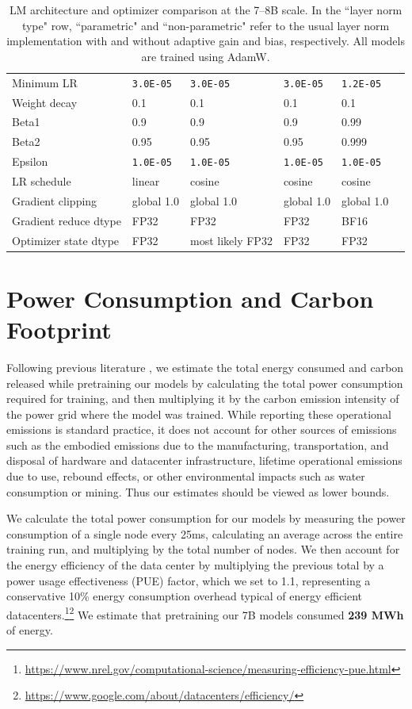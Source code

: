 \documentclass[11pt]{article}
\begin{document}
\begin{table}[t]
\begin{tabular}{l|lllll}
        Minimum LR & \texttt{3.0E-05} & \texttt{3.0E-05} & \texttt{3.0E-05} & \texttt{1.2E-05} \\
        Weight decay & 0.1 & 0.1 & 0.1 & 0.1 \\
        Beta1 & 0.9 & 0.9 & 0.9 & 0.99 \\
        Beta2 & 0.95 & 0.95 & 0.95 & 0.999 \\
        Epsilon & \texttt{1.0E-05} & \texttt{1.0E-05} & \texttt{1.0E-05} & \texttt{1.0E-05} \\
        LR schedule & linear & cosine & cosine & cosine \\
        Gradient clipping & global 1.0 & global 1.0 & global 1.0 & global 1.0 \\
        Gradient reduce dtype & FP32 & FP32 & FP32 & BF16 \\
        Optimizer state dtype & FP32 & most likely FP32 & FP32 & FP32 \\
        \bottomrule
    \end{tabular}
    \caption{LM architecture and optimizer comparison at the 7--8B scale. In the ``layer norm type" row, ``parametric" and ``non-parametric" refer to the usual layer norm implementation with and without adaptive gain and bias, respectively. All models are trained using AdamW.}
    \label{tab:llm_arch_adamw}
\end{table}

\section{Power Consumption and Carbon Footprint}
\label{sec:carbon}

Following previous literature \citep{strubell-etal-2019-energy, patterson2021carbon, wu2022sustainable, dodge2022measuring}, we estimate the total energy consumed and carbon released while pretraining our models by calculating the total power consumption required for training, and then multiplying it by the carbon emission intensity of the power grid where the model was trained. While reporting these operational emissions is standard practice, it does not account for other sources of emissions such as the embodied emissions due to the manufacturing, transportation, and disposal of hardware and datacenter infrastructure, lifetime operational emissions due to use, rebound effects, or other environmental impacts such as water consumption or mining. Thus our estimates should be viewed as lower bounds.

We calculate the total power consumption for our models by measuring the power consumption of a single node every 25ms, calculating an average across the entire training run, and multiplying by the total number of nodes. We then account for the energy efficiency of the data center by multiplying the previous total by a power usage effectiveness (PUE) factor, which we set to 1.1, representing a conservative 10\% energy consumption overhead typical of energy efficient datacenters.\footnote{\protect\url{https://www.nrel.gov/computational-science/measuring-efficiency-pue.html}}\footnote{\protect\url{https://www.google.com/about/datacenters/efficiency/}} We estimate that pretraining our 7B models consumed \textbf{239 MWh} of energy.
\end{document}
